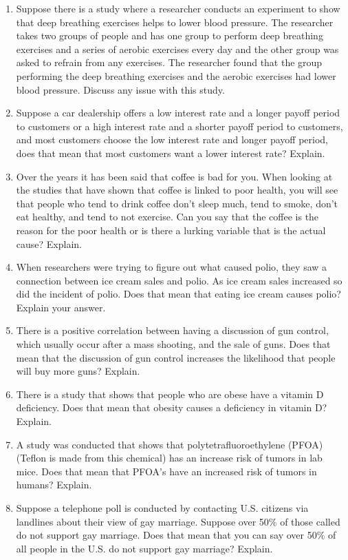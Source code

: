 \documentclass[
]{book}
\begin{document}
\begin{enumerate}
\def\labelenumi{\arabic{enumi}.}
\item
  Suppose there is a study where a researcher conducts an experiment to show that deep breathing exercises helps to lower blood pressure. The researcher takes two groups of people and has one group to perform deep breathing exercises and a series of aerobic exercises every day and the other group was asked to refrain from any exercises. The researcher found that the group performing the deep breathing exercises and the aerobic exercises had lower blood pressure. Discuss any issue with this study.
\item
  Suppose a car dealership offers a low interest rate and a longer payoff period to customers or a high interest rate and a shorter payoff period to customers, and most customers choose the low interest rate and longer payoff period, does that mean that most customers want a lower interest rate? Explain.
\item
  Over the years it has been said that coffee is bad for you. When looking at the studies that have shown that coffee is linked to poor health, you will see that people who tend to drink coffee don't sleep much, tend to smoke, don't eat healthy, and tend to not exercise. Can you say that the coffee is the reason for the poor health or is there a lurking variable that is the actual cause? Explain.
\item
  When researchers were trying to figure out what caused polio, they saw a connection between ice cream sales and polio. As ice cream sales increased so did the incident of polio. Does that mean that eating ice cream causes polio? Explain your answer.
\item
  There is a positive correlation between having a discussion of gun control, which usually occur after a mass shooting, and the sale of guns. Does that mean that the discussion of gun control increases the likelihood that people will buy more guns? Explain.
\item
  There is a study that shows that people who are obese have a vitamin D deficiency. Does that mean that obesity causes a deficiency in vitamin D? Explain.
\item
  A study was conducted that shows that polytetrafluoroethylene (PFOA) (Teflon is made from this chemical) has an increase risk of tumors in lab mice. Does that mean that PFOA's have an increased risk of tumors in humans? Explain.
\item
  Suppose a telephone poll is conducted by contacting U.S. citizens via landlines about their view of gay marriage. Suppose over 50\% of those called do not support gay marriage. Does that mean that you can say over 50\% of all people in the U.S. do not support gay marriage? Explain.

\end{enumerate}
\end{document}
